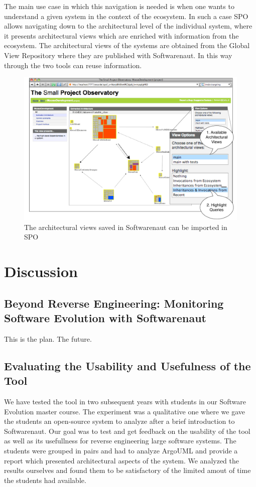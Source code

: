 \documentclass[preprint,12pt]{elsarticle}
\begin{document}
The main use case in which this navigation is needed is when one wants to understand a given system in the context of the ecosystem. In such a case SPO allows navigating down to the architectural level of the individual system, where it presents architectural views which are enriched with information from the ecosystem. The architectural views of the systems are obtained from the Global View Repository where they are published with Softwarenaut. In this way through the two tools can reuse information.

\begin{figure}[th!]
\begin{center}
\includegraphics[width=\linewidth]{images/SpoArchitectural}
\caption{The architectural views saved in Softwarenaut can be imported in SPO}
\label{}
\end{center}
\end{figure}



\newpage
\section {Discussion}
\label {sec:disc}
\subsection {Beyond Reverse Engineering: Monitoring Software Evolution with Softwarenaut}
This is the plan. The future. 

\subsection {Evaluating the Usability and Usefulness of the Tool}
We have tested the tool in two subsequent years with students in our Software Evolution master course. The experiment was a qualitative one where we gave the students an open-source system to analyze after a brief introduction to Softwarenaut. Our goal was to test and get feedback on the usability of the tool as well as its usefullness for reverse engineering large software systems. The students were grouped in pairs and had to analyze ArgoUML and provide a report which presented architectural aspects of the system. We analyzed the results ourselves and found them to be satisfactory of the limited amout of time the students had available. 
\end{document}
